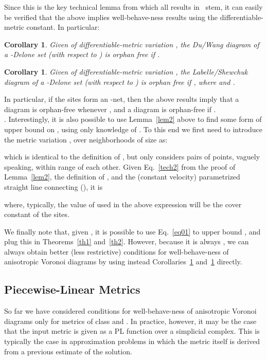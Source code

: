 \documentclass[11pt]{article}
\newtheorem{corollary}[theorem]{Corollary}
\begin{document}
Since this is the key technical lemma from which all results in~\cite{avd} stem, it can easily be verified that the above  implies well-behave-ness results using the differentiable-metric constant. 
In particular:

\begin{corollary}	\label{cor1}
Given  of differentiable-metric variation , 
	the Du/Wang diagram of a -Delone set (with respect to ) is orphan free if 
	.
\end{corollary}

\begin{corollary}	\label{cor2}
Given  of differentiable-metric variation , 
	the Labelle/Shewchuk diagram of a -Delone set (with respect to ) is orphan free if 
	, where  and . 
\end{corollary}

In particular, if the sites form an -net, then the above results imply that a  diagram is orphan-free whenever , and a  diagram is orphan-free
if .  \\

. 
Interestingly, it is also possible to use Lemma~\ref{lem2} above to find some form of upper bound on , using only knowledge of . 
To this end we first need to introduce the metric variation , over neighborhoods of size  as:

which is identical to the definition of , but only considers pairs of points, vaguely speaking, within range  of each other. 
Given Eq.~\ref{tech2} from the proof of Lemma~\ref{lem2}, the definition of , and the (constant velocity) parametrized straight line connecting  (), it is

where, typically, the value of  used in the above expression will be the cover constant of the sites. 

We finally note that, given , it is possible to use Eq.~\ref{eq01} to upper bound , and plug this in Theorems~\ref{th1} and~\ref{th2}. 
However, because it is always ,  we can always obtain better (less restrictive) conditions for well-behave-ness of anisotropic Voronoi diagrams 
by using instead  Corollaries~\ref{cor1} and~\ref{cor2} directly. 


\subsection{Piecewise-Linear Metrics}\label{sec:PL}

So far we have considered conditions for well-behave-ness of anisotropic Voronoi diagrams only for metrics of class  and . 
In practice, however, it may be the case that the input metric is given as a PL function over a simplicial complex. 
This is typically the case in approximation problems in which the metric itself is derived from a previous estimate of the solution. 
\end{document}

